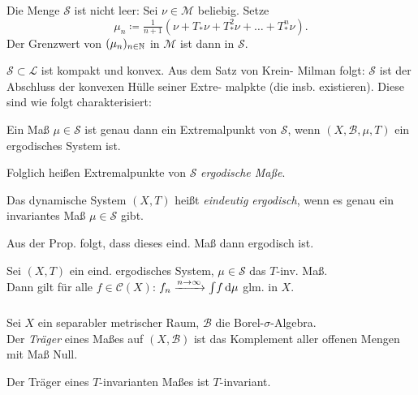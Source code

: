 \documentclass{cheat-sheet}
\newcommand{\Bor}{\mathcal{B}} %
\newcommand{\meST}{$(X, \Bor, \mu, T)$} %
\newcommand{\Lin}{\mathcal{L}} %
\newcommand{\Cont}{\mathcal{C}} %
\newcommand{\Meas}{\mathcal{M}} %
\begin{document}
\begin{bem}
  Die Menge $\mathcal{S}$ ist nicht leer: Sei $\nu \in \Meas$ beliebig. Setze
  \[ \mu_n \coloneqq \tfrac{1}{n+1} \left( \nu + T_* \nu + T^2_* \nu + \ldots + T^n_* \nu \right). \]
  Der Grenzwert von $(\mu_n)_{n \in \mathbb{N}}$ in $\Meas$ ist dann in $\mathcal{S}$.
\end{bem}

\begin{bem}
  $\mathcal{S} \subset \Lin$ ist kompakt und konvex. Aus dem Satz von Krein- Milman folgt: $\mathcal{S}$ ist der Abschluss der konvexen Hülle seiner Extre- malpkte (die insb. existieren). Diese sind wie folgt charakterisiert:
\end{bem}

\begin{prop}
  Ein Maß $\mu \in \mathcal{S}$ ist genau dann ein Extremalpunkt von $\mathcal{S}$, wenn \meST{} ein ergodisches System ist.
\end{prop}

\begin{bem}
  Folglich heißen Extremalpunkte von $\mathcal{S}$ \emph{ergodische Maße}.
\end{bem}

\begin{defn}
  Das dynamische System $(X, T)$ heißt \emph{eindeutig ergodisch}, wenn es genau ein invariantes Maß $\mu \in \mathcal{S}$ gibt.
\end{defn}

\begin{bem}
  Aus der Prop. folgt, dass dieses eind. Maß dann ergodisch ist.
\end{bem}

\begin{thm}
  Sei $(X, T)$ ein eind. ergodisches System, $\mu \!\in\! \mathcal{S}$ das $T$-inv. Maß. \\
  Dann gilt für alle $f \in \Cont(X)$: $f_n \xrightarrow{n \to \infty} {\textstyle \int\limits_{}^{}} f \,\mathrm{d} \mu$ glm. in $X$.
\end{thm}

\begin{defn}
  Sei $X$ ein separabler metrischer Raum, $\Bor$ die Borel-$\sigma$-Algebra. \\
  Der \emph{Träger} eines Maßes auf $(X, \Bor)$ ist das Komplement aller offenen Mengen mit Maß Null.
\end{defn}

\begin{bem}
  Der Träger eines $T$-invarianten Maßes ist $T$-invariant.
\end{bem}
\end{document}
